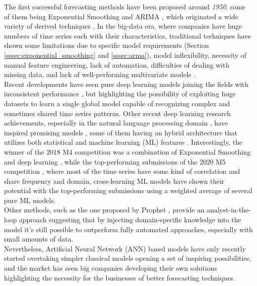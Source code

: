 \documentclass[a4paper, 12pt]{article} %
\begin{document}
	The first successful forecasting methods have been proposed around \textit{1950}, some of them being Exponential Smoothing \cite{ExponentialSmoothingHoltCharles} and ARIMA \cite{ForecastingBoxJenkins}, which originated a wide variety of derived techniques \cite{25YearsForecasting}. In the big-data era, where companies have huge numbers of time series each with their characteristics, traditional techniques have shown some limitations due to specific model requirements (Section \ref{sssec:exponential_smoothing} and \ref{sssec:arma}), model inflexibility, necessity of manual feature engineering, lack of automation, difficulties of dealing with missing data, and lack of well-performing multivariate models \cite{25YearsForecasting}.\\
	Recent developments have seen pure deep learning models joining the fields with inconsistent performance \cite{DeepLearningForecastingSurvey}, but highlighting the possibility of exploiting huge datasets to learn a single global model capable of recognizing complex and sometimes shared time series patterns. Other recent deep learning research achievements, especially in the natural language processing domain \cite{RNNLSTM, seq2seq, EncoderDecoder}, have inspired promising models \cite{DeepAR, DeepState, DeepLearningForecastingSurvey}, some of them having an hybrid architecture that utilizes both statistical and machine learning (ML) features \cite{MAKRIDAKIS2018802, GluonTS}. 
	Interestingly, the winner of the 2018 M4 competition \cite{MAKRIDAKIS2018802} was a combination of Exponential Smoothing and deep learning \cite{UberHybridES}, while the top-performing submissions of the 2020 M5 competition \cite{M5Competition}, where most of the time series have some kind of correlation and share frequency and domain, cross-learning ML models have shown their potential with the top-performing submissions using a weighted average of several pure ML models.\\
	Other methods, such as the one proposed by Prophet \cite{FacebookProphet}, provide an analyst-in-the-loop approach suggesting that by injecting domain-specific knowledge into the model it's still possible to outperform fully automated approaches, especially with small amounts of data.\\
	Nevertheless, Artificial Neural Network (ANN) based models have only recently started overtaking simpler classical models \cite{MAKRIDAKIS2018802, M5Competition} opening a set of inspiring possibilities, and the market has seen big companies developing their own solutions \cite{FacebookProphet, GluonTS, MicrosoftSSA, UberHybridES} highlighting the necessity for the businesses of better forecasting techniques.
	
\end{document}
